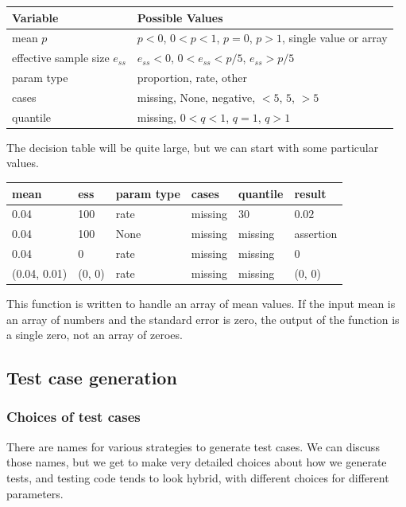 \documentclass[fleqn,10pt]{olplainarticle}
\begin{document}
\begin{center}
    \begin{tabular}{ll}
    \hline
    Variable & Possible Values \\ \hline
    mean $p$ & $p<0$, $0<p<1$, $p=0$, $p>1$, single value or array \\
    effective sample size $e_{ss}$ & $e_{ss} <0$, $0<e_{ss}<p/5$, $e_{ss}>p/5$ \\
    param type & proportion, rate, other \\
    cases & missing, None, negative, $<5$, $5$, $>5$ \\
    quantile & missing, $0<q<1$, $q=1$, $q>1$ \\ \hline
    \end{tabular}
\end{center}
The decision table will be quite large, but we can start with some
particular values.
\begin{center}
    \begin{tabular}{llllll}
    \hline
    mean & ess & param type & cases & quantile & result \\ \hline
    0.04 & 100 & rate & missing & 30 & $0.02$ \\
    0.04 & 100 & None & missing & missing & assertion \\
    0.04 & 0 & rate & missing & missing & 0 \\
    (0.04, 0.01) & (0, 0) & rate & missing & missing & (0, 0)
\end{tabular}
\end{center}

This function is written to handle an array of mean values.
If the input mean is an array of numbers and the standard error
is zero, the output of the function is a single zero, not an array
of zeroes.


\subsection{Test case generation}


\subsubsection{Choices of test cases}
There are names for various strategies to generate test cases.
We can discuss those names, but we get to make very detailed
choices about how we generate tests, and testing code tends
to look hybrid, with different choices for different parameters.
\end{document}
